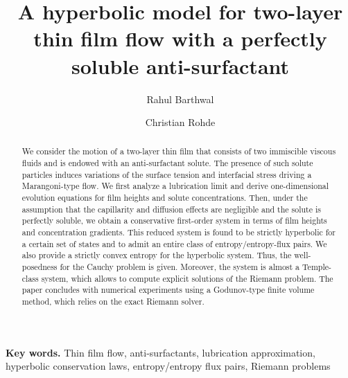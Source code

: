 \documentclass[11pt]{article}
\date{}
\title{A hyperbolic model for two-layer thin film flow with a perfectly soluble anti-surfactant}
\author{Rahul Barthwal}
\author{Christian Rohde}
\affil{\footnotesize Institute of Applied Analysis and Numerical Simulation, University of Stuttgart,\\
Pffafenwaldring 57, Stuttgart, Germany}
\numberwithin{equation}{section}
\newtheorem{counter example}[theorem]{Counter Example}
\begin{document}
\maketitle
\begin{abstract}
We consider the motion of a two-layer thin film that consists of two immiscible viscous fluids and is endowed with an anti-surfactant solute. The presence of such solute particles induces variations of the surface tension and interfacial stress driving a Marangoni-type flow. We first analyze a lubrication limit and derive one-dimensional evolution equations for film heights and solute concentrations. Then, under the assumption that the capillarity and diffusion effects are negligible and the solute is perfectly soluble, we obtain a conservative first-order system in terms of film heights and concentration gradients. This reduced system is found to be strictly hyperbolic for a certain set of states and to admit an entire class of entropy/entropy-flux pairs. We also provide a strictly convex entropy for the hyperbolic system. Thus, the well-posedness for the Cauchy problem is given. Moreover, the system is almost a Temple-class system, which allows to compute explicit solutions of the Riemann problem. The paper concludes with numerical experiments using a Godunov-type finite volume method, which relies on the exact Riemann solver.
\end{abstract}
{\textbf{Key words.} Thin film flow,  anti-surfactants,  lubrication approximation, hyperbolic conservation laws, entropy/entropy flux pairs, Riemann problems}
\medskip 
\end{document}
